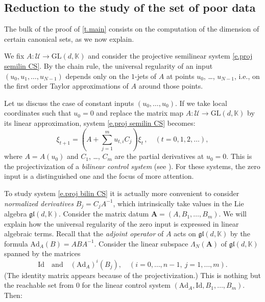 \documentclass[10pt, a4paper]{amsart}
\theoremstyle{plain}
\theoremstyle{definition}
\theoremstyle{remark}
\theoremstyle{note}
\numberwithin{equation}{section}
\begin{document}
\subsection{Reduction to the study of the set of poor data}

The bulk of the proof of \cref{t.main} consists on the computation 
of the dimension of certain canonical sets,
as we now explain.

\medskip

We fix $A \colon {\mathcal{U}} \to {\mathrm{GL}}(d,{\mathbb{K}})$ and consider
the projective semilinear system \eqref{e.proj semilin CS}.
By the chain rule, the universal regularity of an input 
$(u_0, u_1, \ldots, u_{N-1})$
depends only on the $1$-jets of $A$ at points $u_0$, \ldots, $u_{N-1}$,
i.e., on the first order Taylor approximations of $A$ around those points.

Let us discuss the case of constant inputs $(u_0, \ldots, u_0)$.
If we take local coordinates such that $u_0 = 0$
and replace the matrix map $A \colon {\mathcal{U}} \to {\mathrm{GL}}(d,{\mathbb{K}})$
by its linear approximation, system \eqref{e.proj semilin CS} becomes:
\begin{equation}\label{e.proj bilin CS}
\xi_{t+1} = \left(A + \sum_{j=1}^m u_{t,i} C_j \right) \xi_t  
\, , \quad (t = 0, 1, 2, \dots) ,
\end{equation}
where $A = A(u_0)$ 
and $C_1$, \dots, $C_m$ are the partial derivatives at $u_0=0$.
This is the projectivization of a \emph{bilinear control system} (see \cite{Elliott}).
For these systems, the zero input is a distinguished one and the focus of more attention.

To study system \eqref{e.proj bilin CS} it is actually more convenient to consider
\emph{normalized derivatives} $B_j = C_j A^{-1}$,
which intrinsically take values in the Lie algebra ${\mathfrak{gl}}(d,{\mathbb{K}})$.
Consider the matrix datum ${\mathbf{A}} = (A, B_{1}, \ldots, B_{m})$.
We will explain how the universal regularity of the zero input
is expressed in linear algebraic terms.
Recall that the \emph{adjoint operator} of $A$ acts on ${\mathfrak{gl}}(d,{\mathbb{K}})$
by the formula ${\mathrm{Ad}}_A(B) = A B A^{-1}$.
Consider the linear subspace $\Lambda_N({\mathbf{A}})$ of ${\mathfrak{gl}}(d,{\mathbb{K}})$ spanned by the matrices
$$
{\mathrm{Id}} \quad \text{and} \quad
({\mathrm{Ad}}_A)^i(B_j), \quad (i=0,\ldots,n-1, \ j=1,\ldots, m).
$$
(The identity matrix appears because of the projectivization.)
This is nothing but the reachable set from $0$ 
for the linear control system $({\mathrm{Ad}}_A, {\mathrm{Id}}, B_1, \dots, B_m)$.
Then:
\end{document}
